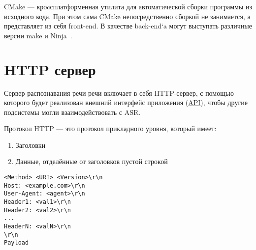 CMake — кроcсплатформенная утилита для автоматической сборки программы из
исходного кода. При этом сама CMake непосредственно сборкой не занимается,
а представляет из себя front-end. В качестве back-end`a могут выступать
различные версии make и Ninja~\cite{cmake}.

\section{HTTP сервер}
Сервер распознавания речи речи включает в себя HTTP-сервер, с помощью которого
будет реализован внешний интерфейс приложения (\hyperlink{api}{API}), чтобы другие
подсистемы могли взаимодействовать с ASR.

Протокол HTTP --- это протокол прикладного уровня, который имеет:
\begin{enumerate}
    \item Заголовки
    \item Данные, отделённые от заголовков пустой строкой
\end{enumerate}

\begin{lstlisting}[caption={Общая структура HTTP протокола}, label={lst:http:struct}]
<Method> <URI> <Version>\r\n
Host: <example.com>\r\n
User-Agent: <agent>\r\n
Header1: <val1>\r\n
Header2: <val2>\r\n
...
HeaderN: <valN>\r\n
\r\n
Payload
\end{lstlisting}

